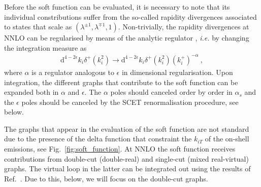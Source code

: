 \documentclass{appolb}
\newcommand{\dd}{\text{d}}
\begin{document}
Before the soft function can be evaluated, it is necessary to note that its individual constributions suffer from the so-called rapidity divergences associated to states that scale as $(\lambda^{\pm1},\lambda^{\mp1},1)$. Non-trivially, the rapidity divergences at NNLO can be regularised by means of the analytic regulator \cite{Li:2013mia, Becher:2011dz}, \emph{i.e.} by changing the integration measure as
\begin{align}
\dd^{4-2\epsilon} k_{i} \delta^{+}(k_i^2)\to \dd^{4-2\epsilon} k_{i} \delta^{+}(k_i^2) (k^+_i)^{-\alpha}~,
\end{align}
where $\alpha$ is a regulator analogous to $\epsilon$ in dimensional regularisation. Upon integration, the different graphs that contribute to the soft function can be expanded both in $\alpha$ and $\epsilon$. The $\alpha$ poles should canceled order by order in $\alpha_s$ and the $\epsilon$ poles should be canceled by the SCET renormalisation procedure, see below. 


The graphs that appear in the evaluation of the soft function are not standard due to the presence of the delta function that constraint the $k_{iT}$ of the on-shell emissions, see Fig.~\ref{fig:soft_function}. 
At NNLO the soft function receives contributions from  double-cut (double-real) and single-cut (mixed real-virtual) graphs. The virtual loop in the latter can be integrated out using the results of Ref.~\cite{Bierenbaum:2011gg}. Due to this, below, we will focus on the double-cut graphs.
\end{document}
